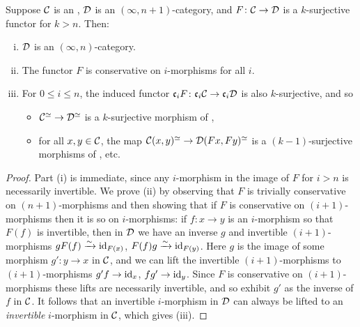\documentclass[a4paper,11pt]{article}
\begin{document}
\begin{lemma}
  Suppose $\mathcal{C}$ is an \incat{}, $\mathcal{D}$ is an $(\infty,n+1)$-category,
  and $F \colon \nC \to \nD$ is a $k$-surjective functor for $k >
  n$. Then:
  \begin{enumerate}[(i)]
  \item $\mathcal{D}$ is an $(\infty,n)$-category.
  \item The functor $F$ is conservative on $i$-morphisms for all $i$.
  \item For $0 \leq i \leq n$, the induced functor $\core[i] F \colon \core[i]\nC \to \core[i]\nD$ is also
    $k$-surjective, and so
    \begin{itemize}
    \item $\nC^{\simeq} \to \nD^{\simeq}$ is a $k$-surjective morphism
      of \igpds{},
    \item for all $x,y \in \mathcal{C}$, the map $\nC(x,y)^{\simeq} \to
      \nD(Fx,Fy)^{\simeq}$ is a $(k-1)$-surjective morphisms of
      \igpds{}, etc.
    \end{itemize}
  \end{enumerate}
\end{lemma}
\begin{proof}
  Part (i) is immediate, since any $i$-morphism in the image of $F$
  for $i > n$ is necessarily invertible. We prove (ii) by observing
  that $F$ is trivially conservative on $(n+1)$-morphisms and then
  showing that if $F$ is conservative on $(i+1)$-morphisms then it is
  so on $i$-morphisms: if $f \colon x \to y$ is an $i$-morphism so
  that $F(f)$ is invertible, then in $\mathcal{D}$ we have an inverse $g$ and
  invertible $(i+1)$-morphisms $gF(f) \isoto \id_{F(x)}$,
  $F(f)g \isoto \id_{F(y)}$. Here $g$ is the image of some morphism
  $g' \colon y \to x$ in $\mathcal{C}$, and we can lift the invertible
  $(i+1)$-morphisms to $(i+1)$-morphisms $g'f \to \id_{x}$,
  $fg' \to \id_{y}$. Since $F$ is conservative on $(i+1)$-morphisms
  these lifts are necessarily invertible, and so exhibit $g'$ as the
  inverse of $f$ in $\mathcal{C}$. It follows that an invertible $i$-morphism
  in $\mathcal{D}$ can always be lifted to an \emph{invertible} $i$-morphism
  in $\mathcal{C}$, which gives (iii).
\end{proof}
\end{document}
